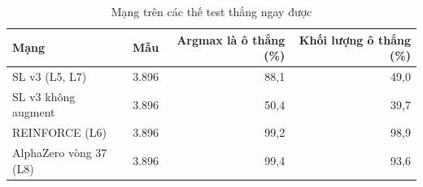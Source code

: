\begin{table}[H]
  \centering
  \small
  \caption{Mạng trên các thế test thắng ngay được}
  \label{tab:cs-dl-mang-thang}
  \begin{tabular}{lrrr}
    \toprule
    Mạng & Mẫu & Argmax là ô thắng (\%) & Khối lượng ô thắng (\%) \\
    \midrule
    SL v3 (L5, L7) & 3.896 & 88,1 & 49,0 \\
    SL v3 không augment & 3.896 & 50,4 & 39,7 \\
    REINFORCE (L6) & 3.896 & 99,2 & 98,9 \\
    AlphaZero vòng 37 (L8) & 3.896 & 99,4 & 93,6 \\
    \bottomrule
  \end{tabular}
\end{table}
